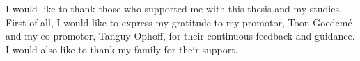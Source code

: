 I would like to thank those who supported me with this thesis and my studies. First of all, I would like to express my gratitude to my promotor, Toon Goedemé and my co-promotor, Tanguy Ophoff, for their continuous feedback and guidance. I would also like to thank my family for their support. 
